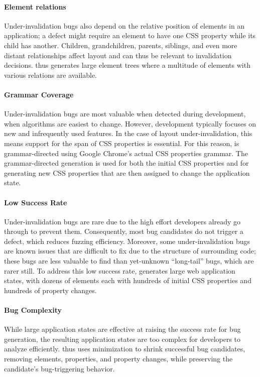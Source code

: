 \paragraph{Element relations}
Under-invalidation bugs also depend on
  the relative position of elements in an application;
  a defect might require an element to have one CSS property
  while its child has another.
Children, grandchildren, parents, siblings,
  and even more distant relationships affect layout
  and can thus be relevant to invalidation decisions.
\toolname thus generates large element trees
  where a multitude of elements with various relations are available.

\paragraph{Grammar Coverage}
Under-invalidation bugs are most valuable when detected
  during development, when algorithms are easiest to change.
However, development typically focuses on new and infrequently used features.
In the case of layout under-invalidation,
  this means support for the span of CSS properties is essential.
For this reason, \toolname is grammar-directed
  using Google Chrome's actual CSS properties grammar.
The grammar-directed generation is used for
  both the initial CSS properties and for
  generating new CSS properties that are then
  assigned to change the application state.

\paragraph{Low Success Rate}
Under-invalidation bugs are rare due to
  the high effort developers already go through to prevent them.
Consequently, most bug candidates do not trigger a defect,
  which reduces fuzzing efficiency.
Moreover, some under-invalidation bugs are known issues
  that are difficult to fix due to the structure of surrounding code;
  these bugs are less valuable to find
  than yet-unknown ``long-tail'' bugs,
  which are rarer still.
To address this low success rate,
  \toolname generates large web application states,
  with dozens of elements each with
  hundreds of initial CSS properties
  and hundreds of property changes.

\paragraph{Bug Complexity}
While large application states are effective at
  raising the success rate for bug generation,
  the resulting application states are too complex
  for developers to analyze efficiently.
\toolname thus uses minimization to shrink successful bug candidates,
  removing elements, properties, and property changes,
  while preserving the candidate's bug-triggering behavior.

